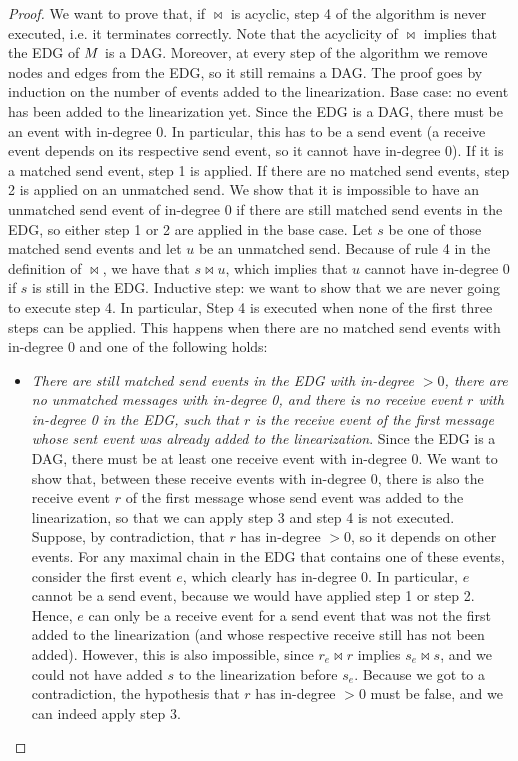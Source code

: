 \nnalgotermination*
\begin{proof}
We want to prove that, if $\bowtie$ is acyclic, step 4 of the algorithm is never executed, i.e. it terminates correctly. Note that the acyclicity of $\bowtie$ implies that the EDG of $M$ is a DAG. Moreover, at every step of the algorithm we remove nodes and edges from the EDG, so it still remains a DAG. The proof goes by induction on the number of events added to the linearization.\newline
Base case: no event has been added to the linearization yet. Since the EDG is a DAG, there must be an event with in-degree 0. In particular, this has to be a send event (a receive event depends on its respective send event, so it cannot have in-degree 0). If it is a matched send event, step 1 is applied. If there are no matched send events, step 2 is applied on an unmatched send. We show that it is impossible to have an unmatched send event of in-degree 0 if there are still matched send events in the EDG, so either step 1 or 2 are applied in the base case. Let $s$ be one of those matched send events and let $u$ be an unmatched send. Because of rule 4 in the definition of $\bowtie$, we have that $s \bowtie u$, which implies that $u$ cannot have in-degree 0 if $s$ is still in the EDG.\newline
Inductive step: we want to show that we are never going to execute step 4. In particular, Step 4 is executed when none of the first three steps can be applied. This happens when there are no matched send events with in-degree 0 and one of the following holds:
\begin{itemize}%
	\item \emph{There are still matched send events in the EDG with in-degree $>0$, there are no unmatched messages with in-degree 0, and there is no receive event $r$ with in-degree 0 in the EDG, such that $r$ is the receive event of the first message whose sent event was already added to the linearization}. Since the EDG is a DAG, there must be at least one receive event with in-degree 0. We want to show that, between these receive events with in-degree 0, there is also the receive event $r$ of the first message whose send event was added to the linearization, so that we can apply step 3 and step 4 is not executed. Suppose, by contradiction, that $r$ has in-degree $>0$, so it depends on other events. For any maximal chain in the EDG that contains one of these events, consider the first event $e$, which clearly has in-degree 0. In particular, $e$ cannot be a send event, because we would have applied step 1 or step 2. Hence, $e$ can only be a receive event for a send event that was not the first added to the linearization (and whose respective receive still has not been added). However, this is also impossible, since $r_e \bowtie r$ implies $s_e \bowtie s$, and we could not have added $s$ to the linearization before $s_e$. Because we got to a contradiction, the hypothesis that $r$ has in-degree $>0$ must be false, and we can indeed apply step 3.

\end{itemize}
\end{proof}
